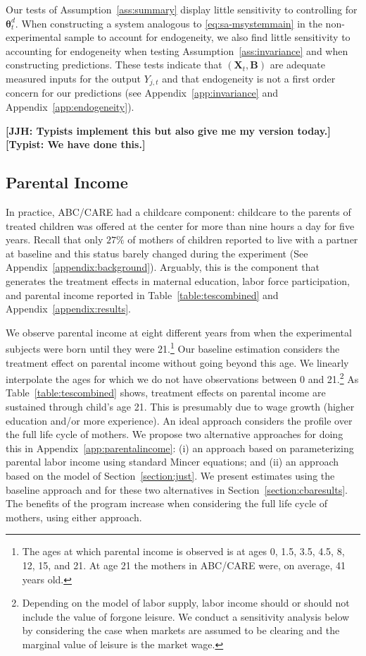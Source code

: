 Our tests of Assumption~\ref{ass:summary} display little sensitivity to controlling for $\bm{\theta}_{t}^d$. When constructing a system analogous to \eqref{eq:sa-msystemmain} in the non-experimental sample to account for endogeneity, we also find little sensitivity to accounting for endogeneity when testing Assumption~\ref{ass:invariance} and when constructing predictions. These tests indicate that  $\left( \bm{X}_{t}, \bm{B} \right)$ are adequate measured inputs for the output $Y_{j,t}$ and that endogeneity is not a first order concern for our predictions (see Appendix~\ref{app:invariance} and Appendix~\ref{app:endogeneity}).

\noindent \textbf{[JJH: Typists implement this but also give me my version today.] [Typist: We have done this.]}

\subsection{Parental Income} \label{section:pincome}

In practice, ABC/CARE had a childcare component: childcare to the parents of treated children was offered at the center for more than nine hours a day for five years. Recall that only $27\%$ of mothers of children reported to live with a partner at baseline and this status barely changed during the experiment (See Appendix~\ref{appendix:background}). Arguably, this is the component that generates the treatment effects in maternal education, labor force participation, and parental income reported in Table~\ref{table:tescombined} and Appendix~\ref{appendix:results}.

We observe parental income at eight different years from when the experimental subjects were born until they were 21.\footnote{The ages at which parental income is observed is at ages 0, 1.5, 3.5, 4.5, 8, 12, 15, and 21. At age 21 the mothers in ABC/CARE were, on average, 41 years old.} Our baseline estimation considers the treatment effect on parental income without going beyond this age. We linearly interpolate the ages for which we do not have observations between 0 and 21.\footnote{Depending on the model of labor supply, labor income should or should not include the value of forgone leisure. We conduct a sensitivity analysis below by considering the case when markets are assumed to be clearing and the marginal value of leisure is the market wage.} As Table~\ref{table:tescombined} shows, treatment effects on parental income are sustained through child's age 21. This is presumably due to wage growth (higher education and/or more experience). An ideal approach considers the profile over the full life cycle of mothers. We propose two alternative approaches for doing this in Appendix~\ref{app:parentalincome}: (i) an approach based on parameterizing parental labor income using standard Mincer equations; and (ii) an approach based on the model of Section~\ref{section:just}. We present estimates using the baseline approach and for these two alternatives in Section~\ref{section:cbaresults}. The benefits of the program increase when considering the full life cycle of mothers, using either approach.

